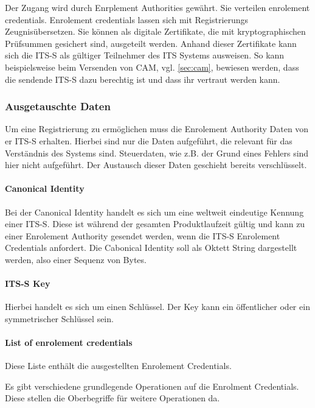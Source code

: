 Der Zugang wird durch Enrplement Authorities gewährt. Sie verteilen  enrolement credentials. Enrolement credentials lassen sich mit \glqq Registrierungs Zeugnis\grqq übersetzen. Sie können als digitale Zertifikate, die  mit kryptographischen Prüfsummen gesichert sind, ausgeteilt werden. Anhand dieser Zertifikate kann sich die \ac{ITS-S} als gültiger Teilnehmer des \ac{ITS} Systems ausweisen. So kann beispielsweise beim Versenden von \ac{CAM}, vgl. \autoref{sec:cam}, bewiesen werden, dass die sendende \ac{ITS-S} dazu berechtig ist und dass ihr vertraut werden kann. 

\subsubsection{Ausgetauschte Daten}
Um eine Registrierung zu ermöglichen muss die Enrolement Authority Daten von er \ac{ITS-S} erhalten. Hierbei sind nur die Daten aufgeführt, die relevant für das Verständnis des Systems sind. Steuerdaten, wie z.B. der Grund eines Fehlers sind hier nicht aufgeführt. Der Austausch dieser Daten geschieht bereits verschlüsselt. 

\paragraph{Canonical Identity} Bei der Canonical Identity handelt es sich um eine weltweit eindeutige Kennung einer \ac{ITS-S}. Diese ist während der gesamten Produktlaufzeit gültig und kann zu einer Enrolement Authority gesendet werden, wenn die \ac{ITS-S} Enrolement Credentials anfordert. Die Cabonical Identity soll als Oktett String dargestellt werden, also einer Sequenz von Bytes.

\paragraph{ITS-S Key}
Hierbei handelt es sich um einen Schlüssel. Der Key kann ein öffentlicher oder ein symmetrischer Schlüssel sein. 

\paragraph{List of enrolement credentials}
Diese Liste enthält die ausgestellten Enrolement Credentials. 

Es gibt verschiedene grundlegende Operationen auf die Enrolment Credentials. Diese stellen die Oberbegriffe für weitere Operationen da. 


